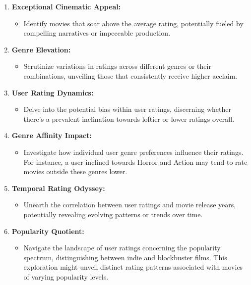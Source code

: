 \documentclass[
]{article}
\providecommand{\tightlist}{%
  \setlength{\itemsep}{0pt}\setlength{\parskip}{0pt}}
\begin{document}
\begin{enumerate}
\def\labelenumi{\arabic{enumi}.}
\tightlist
\item
  \textbf{Exceptional Cinematic Appeal:}

  \begin{itemize}
  \tightlist
  \item
    Identify movies that soar above the average rating, potentially
    fueled by compelling narratives or impeccable production.
  \end{itemize}
\item
  \textbf{Genre Elevation:}

  \begin{itemize}
  \tightlist
  \item
    Scrutinize variations in ratings across different genres or their
    combinations, unveiling those that consistently receive higher
    acclaim.
  \end{itemize}
\item
  \textbf{User Rating Dynamics:}

  \begin{itemize}
  \tightlist
  \item
    Delve into the potential bias within user ratings, discerning
    whether there's a prevalent inclination towards loftier or lower
    ratings overall.
  \end{itemize}
\item
  \textbf{Genre Affinity Impact:}

  \begin{itemize}
  \tightlist
  \item
    Investigate how individual user genre preferences influence their
    ratings. For instance, a user inclined towards Horror and Action may
    tend to rate movies outside these genres lower.
  \end{itemize}
\item
  \textbf{Temporal Rating Odyssey:}

  \begin{itemize}
  \tightlist
  \item
    Unearth the correlation between user ratings and movie release
    years, potentially revealing evolving patterns or trends over time.
  \end{itemize}
\item
  \textbf{Popularity Quotient:}

  \begin{itemize}
  \tightlist
  \item
    Navigate the landscape of user ratings concerning the popularity
    spectrum, distinguishing between indie and blockbuster films. This
    exploration might unveil distinct rating patterns associated with
    movies of varying popularity levels.
  \end{itemize}
\end{enumerate}
\end{document}
